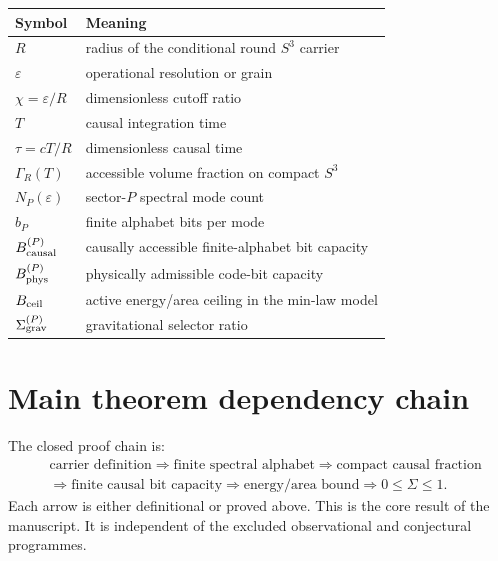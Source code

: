 \documentclass[11pt,a4paper]{article}
\begin{document}
\begin{center}
\begin{tabular}{ll}
\toprule
Symbol & Meaning\\
\midrule
$R$ & radius of the conditional round $S^3$ carrier\\
$\varepsilon$ & operational resolution or grain\\
$\chi=\varepsilon/R$ & dimensionless cutoff ratio\\
$T$ & causal integration time\\
$\tau=cT/R$ & dimensionless causal time\\
$\Gamma_R(T)$ & accessible volume fraction on compact $S^3$\\
$N_P(\varepsilon)$ & sector-$P$ spectral mode count\\
$b_P$ & finite alphabet bits per mode\\
$B_{\rm causal}^{(P)}$ & causally accessible finite-alphabet bit capacity\\
$B_{\rm phys}^{(P)}$ & physically admissible code-bit capacity\\
$B_{\rm ceil}$ & active energy/area ceiling in the min-law model\\
$\Sigma_{\rm grav}^{(P)}$ & gravitational selector ratio\\
\bottomrule
\end{tabular}
\end{center}

\section{Main theorem dependency chain}

The closed proof chain is:
\[
\begin{aligned}
&\text{carrier definition}
\Rightarrow \text{finite spectral alphabet}
\Rightarrow \text{compact causal fraction}\\
&\Rightarrow \text{finite causal bit capacity}
\Rightarrow \text{energy/area bound}
\Rightarrow 0\le\Sigma\le1.
\end{aligned}
\]
Each arrow is either definitional or proved above.  This is the core result of the manuscript.  It is independent of the excluded observational and conjectural programmes.
\end{document}
